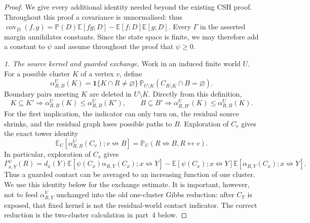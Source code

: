 \documentclass[11pt]{article}
\theoremstyle{definition}
\theoremstyle{remark}
\newcommand{\PP}{\mathbb P}
\newcommand{\EE}{\mathbb E}
\newcommand{\one}{\mathbf 1}
\newcommand{\con}{\leftrightarrow}
\newcommand{\ncon}{\not\leftrightarrow}
\begin{document}
\begin{proof}
We give every additional identity needed beyond the existing CSH proof.
Throughout this proof a covariance is unnormalised: thus
\(\operatorname{cov}_D(f,g)=\PP(D)\EE[fg;D]-\EE[f;D]\EE[g;D]\).
Every $\Gamma$ in the asserted margin annihilates constants.  Since the
state space is finite, we may therefore add a constant to $\psi$ and
assume throughout the proof that $\psi\geq0$.

\emph{1. The source kernel and guarded exchange.}
Work in an induced finite world $U$.  For a possible cluster $K$ of a
vertex $v$, define
\begin{equation}\label{eq:alpha-kernel}
 \alpha_{R,B}^{U}(K)=
 \one\{K\cap R\ne\varnothing\}\,
 \PP_{U\setminus K}(C_{R\setminus K}\cap B=\varnothing).
\end{equation}
Boundary pairs meeting $K$ are deleted in $U\setminus K$.  Directly from
this definition,
\begin{equation}\label{eq:alpha-properties}
 K\subseteq K'\Longrightarrow
 \alpha_{R,B}^{U}(K)\leq\alpha_{R,B}^{U}(K'),
 \qquad B\subseteq B'\Longrightarrow
 \alpha_{R,B'}^{U}(K)\leq\alpha_{R,B}^{U}(K).
\end{equation}
For the first implication, the indicator can only turn on, the residual
source shrinks, and the residual graph loses possible paths to $B$.
Exploration of $C_v$ gives the exact tower identity
\begin{equation}\label{eq:alpha-tower}
 \EE_U[\alpha_{R,B}^{U}(C_v);v\ncon B]
 =\PP_U(R\ncon B,R\con v).
\end{equation}
In particular, exploration of $C_x$ gives
\begin{equation}\label{eq:gamma-alpha}
 \Gamma_{x,Y}^{\psi}(R)
 =d_x(Y)\EE[\psi(C_x)\alpha_{R,Y}(C_x);x\ncon Y]
  -\EE[\psi(C_x);x\ncon Y]
   \EE[\alpha_{R,Y}(C_x);x\ncon Y].
\end{equation}
Thus a guarded contact can be averaged to an increasing function of one
cluster.  We use this identity below for the exchange estimate.  It is
important, however, not to feed $\alpha_{R,Y}^{V}$ unchanged into the
old one-cluster Gibbs reduction: after $C_Y$ is exposed, that fixed kernel
is not the residual-world contact indicator.  The correct reduction is
the two-cluster calculation in part~4 below.


\end{proof}
\end{document}
